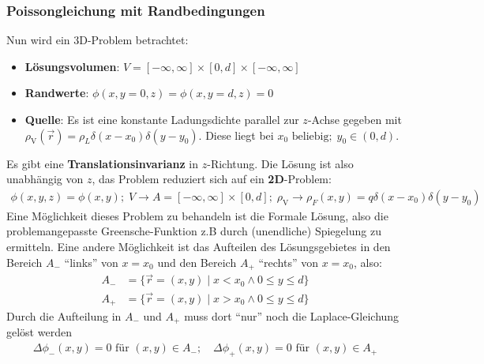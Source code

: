   \subsubsection{Poissongleichung mit Randbedingungen}
  Nun wird ein 3D-Problem betrachtet:
  \begin{itemize}
		   \item \textbf{Lösungsvolumen}: $V = [-\infty,\infty] \times [0,d]\times [-\infty,\infty]$
		  \item  \textbf{Randwerte}: $\phi(x,y=0,z)=\phi(x,y=d,z) = 0$
		   \item \textbf{Quelle}: Es ist eine konstante Ladungsdichte parallel zur $z$-Achse gegeben mit $\rho_\text{V} (\vec{r} )
			        = \rho_L \delta(x-x_0)\delta(y-y_0)$. Diese liegt bei $x_0 \text{ beliebig};\; y_0
			        \in (0,d)$.
\end{itemize}
		   Es gibt eine \textbf{Translationsinvarianz} in $z$-Richtung. Die Lösung ist also unabhängig von $z$, das Problem reduziert sich auf ein \textbf{2D}-Problem:
		        \begin{equation}\begin{split}
				        \phi(x,y,z) = \phi(x,y); \; V\to A= [-\infty,\infty] \times [0,d]; \; \rho_\text{V} \to \rho_F(x,y) = q \delta(x-x_0)\delta(y-y_0)
			        \end{split}\end{equation}
		   Eine Möglichkeit dieses Problem zu behandeln ist die Formale Lösung, also die problemangepasste Greensche-Funktion z.B durch (unendliche) Spiegelung zu ermitteln. Eine andere Möglichkeit ist das Aufteilen des Lösungsgebietes in den Bereich $A_-$ \enquote{links} von $x=x_0$ und den Bereich $A_+$ \enquote{rechts} von $x=x_0$, also:
		        \begin{equation}\label{auft}\begin{split}
				        A_- &= \{\vec{r}  = (x,y)\; |\; x<x_0 \land 0\le y\le d \} \\
				        A_+ &= \{\vec{r}  = (x,y)\; |\; x>x_0 \land 0\le y\le d \}
			        \end{split}\end{equation}
		   Durch die Aufteilung in $A_-$ und $A_+$ muss dort \enquote{nur} noch die Laplace-Gleichung gelöst werden
		        \begin{equation}\begin{split}
				        \Delta \phi_-  (x,y) = 0 \text{ für } (x,y) \in A_- ;\quad \Delta \phi_+ (x,y) = 0 \text{ für } (x,y) \in A_+
			        \end{split}\end{equation}

